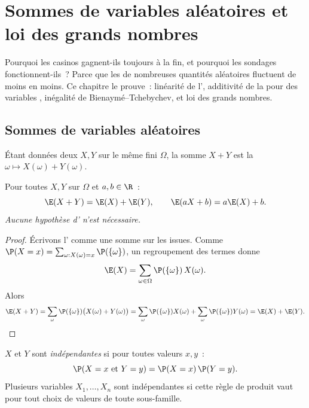 \chapter{Sommes de variables aléatoires et loi des grands nombres}\label{ch:g12:sums}

Pourquoi les casinos gagnent-ils toujours à la fin, et pourquoi les sondages
fonctionnent-ils~? Parce que les  de nombreuses quantités aléatoires
 fluctuent de moins en moins. Ce chapitre le prouve~: linéarité
de l', additivité de la  pour des variables ,
inégalité de Bienaymé--Tchebychev, et loi des grands nombres.

\section{Sommes de variables aléatoires}

Étant données deux  $X, Y$ sur le même  fini
$\Omega$, la somme $X + Y$ est la 
$\omega \mapsto X(\omega) + Y(\omega)$.

\begin{theorem}\label{thm:g12:sums:linearity}
Pour toutes  $X, Y$ sur $\Omega$ et $a, b \in \R$~:
\[
\E(X + Y) = \E(X) + \E(Y), \qquad \E(aX + b) = a\E(X) + b .
\]
\emph{Aucune hypothèse d' n'est nécessaire.}
\end{theorem}

\begin{proof}
Écrivons l' comme une somme sur les
issues. Comme $\P(X = x) = \sum_{\omega : X(\omega) = x} \P(\{\omega\})$,
un regroupement des termes donne
\[
\E(X) = \sum_{\omega \in \Omega} \P(\{\omega\})\,X(\omega) .
\]
Alors
\[
\E(X + Y) = \sum_{\omega} \P(\{\omega\})\bigl(X(\omega) + Y(\omega)\bigr)
= \sum_{\omega} \P(\{\omega\})X(\omega)
+ \sum_{\omega} \P(\{\omega\})Y(\omega) = \E(X) + \E(Y). \qedhere
\]
\end{proof}

\begin{definition}\label{def:g12:sums:indep}
$X$ et $Y$ sont \emph{indépendantes}
si pour toutes valeurs $x, y$~:
\[
\P(X = x \text{ et } Y = y) = \P(X = x)\,\P(Y = y).
\]
Plusieurs variables $X_1, \dots, X_n$ sont indépendantes si cette règle de
produit vaut pour tout choix de valeurs de toute sous-famille.
\end{definition}

